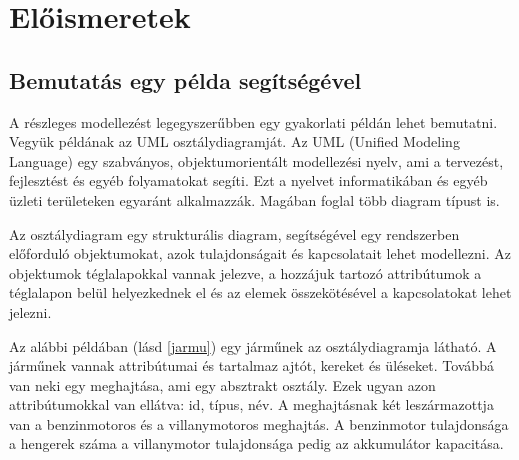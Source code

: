 \chapter{Előismeretek}

\section{Bemutatás egy példa segítségével}

A részleges modellezést legegyszerűbben egy gyakorlati példán lehet bemutatni. Vegyük példának az UML osztálydiagramját. Az UML (Unified Modeling Language) egy szabványos, objektumorientált modellezési nyelv, ami a tervezést, fejlesztést és egyéb folyamatokat segíti. Ezt a nyelvet informatikában és egyéb üzleti területeken egyaránt alkalmazzák. Magában foglal több diagram típust is.
\par
Az osztálydiagram egy strukturális diagram, segítségével egy rendszerben előforduló objektumokat, azok tulajdonságait és kapcsolatait lehet modellezni. Az objektumok téglalapokkal vannak jelezve, a hozzájuk tartozó attribútumok a téglalapon belül helyezkednek el és az elemek összekötésével a kapcsolatokat lehet jelezni.
\par
Az alábbi példában (lásd \autoref{jarmu}) egy járműnek az osztálydiagramja látható. A járműnek vannak attribútumai és tartalmaz ajtót, kereket és üléseket. Továbbá van neki egy meghajtása, ami egy absztrakt osztály. Ezek ugyan azon attribútumokkal van ellátva: id, típus, név. A meghajtásnak két leszármazottja van a benzinmotoros és a villanymotoros meghajtás. A benzinmotor tulajdonsága a hengerek száma a villanymotor tulajdonsága pedig az akkumulátor kapacitása.

